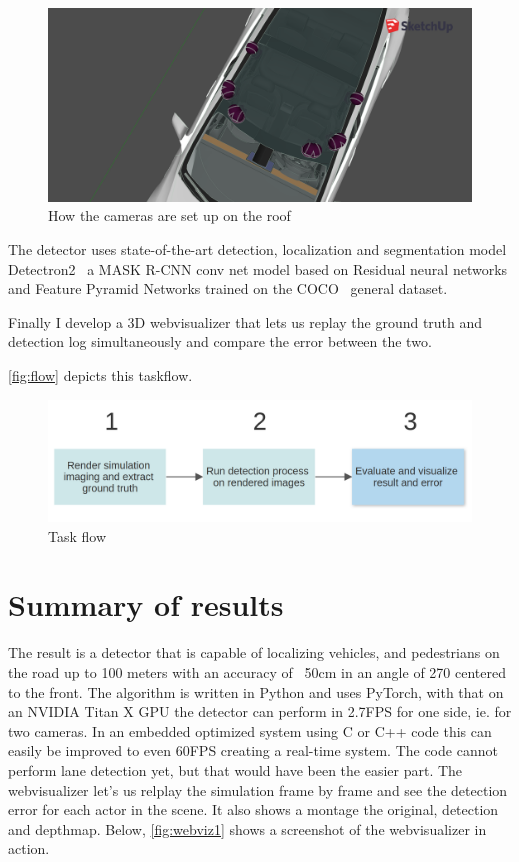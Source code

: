 \begin{figure}[!ht]
    \centering
    \includegraphics[width=150mm, keepaspectratio]{figures/3dmodel2.png}
    \caption{How the cameras are set up on the roof}
    \label{fig:3dmodel2}
\end{figure}

The detector uses state-of-the-art detection, localization and segmentation model
Detectron2~\cite{wu2019detectron2} a MASK R-CNN conv net model based on Residual
neural networks and Feature Pyramid Networks trained on the COCO~\cite{DBLP:journals/corr/LinMBHPRDZ14} general
dataset.

Finally I develop a 3D webvisualizer that lets us replay the ground truth and
detection log simultaneously and compare the error between the two.

\autoref{fig:flow} depicts this taskflow.

\begin{figure}[!ht]
    \centering
    \includegraphics[width=150mm, keepaspectratio]{figures/flowchart.png}
    \caption{Task flow}
    \label{fig:flow}
\end{figure}

\section{Summary of results}

The result is a detector that is capable of localizing vehicles, and pedestrians
on the road up to 100 meters with an accuracy of ~50cm in an angle of 270\degree
centered to the front. The algorithm is written in Python and uses PyTorch, with that on
an NVIDIA Titan X GPU the detector can perform in 2.7FPS for one side, ie. for
two cameras. In an embedded optimized system using C or C++ code this can easily
be improved to even 60FPS creating a real-time system. The code cannot perform
lane detection yet, but that would have been the easier part. The webvisualizer
let's us relplay the simulation frame by frame and see the detection error for
each actor in the scene. It also shows a montage the original, detection and
depthmap. Below, \autoref{fig:webviz1} shows a screenshot of the webvisualizer
in action.

